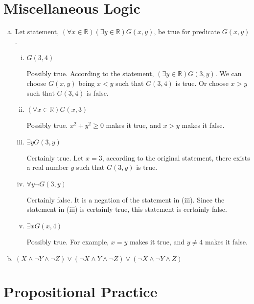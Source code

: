 \documentclass{article}
\begin{document}
\section{Miscellaneous Logic}

\begin{enumerate}[(a)]
    \item Let statement, $(\forall x \in \mathbb{R})(\exists y \in \mathbb{R}) G(x, y)$, be true for predicate $G(x, y)$.
    \begin{enumerate}[(i)]
        \item $G(3, 4)$
        
        Possibly true. According to the statement, $(\exists y \in \mathbb{R}) G(3, y)$. We can choose $G(x, y)$ being $x < y$ such that $G(3, 4)$ is true. Or choose $x > y$ such that $G(3, 4)$ is false.
        
        \item $(\forall x \in \mathbb{R}) G(x, 3)$
        
        Possibly true. $x^2 + y^2 \geq 0$ makes it true, and $x > y$ makes it false.
        
        \item $\exists y G(3, y)$
        
        Certainly true. Let $x = 3$, according to the original statement, there exists a real number $y$ such that $G(3, y)$ is true.
        
        \item $\forall y \neg G(3, y)$
        
        Certainly false. It is a negation of the statement in (iii). Since the statement in (iii) is certainly true, this statement is certainly false.
        
        \item $\exists x G(x, 4)$
        
        Possibly true. For example, $x = y$ makes it true, and $y \neq 4$ makes it false.
        
    \end{enumerate}
    
    \item $(X \land \neg Y \land \neg Z) \lor (\neg X \land Y \land \neg Z) \lor (\neg X \land \neg Y \land Z)$
\end{enumerate}

\section{Propositional Practice}
\end{document}
